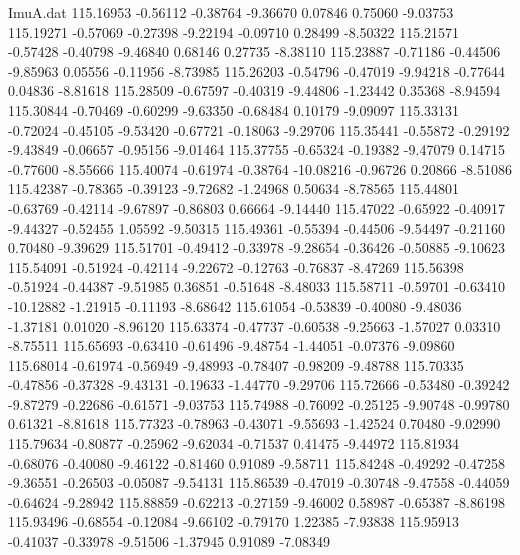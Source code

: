 \begin{filecontents}{ImuA.dat}
 115.16953   -0.56112   -0.38764   -9.36670    0.07846    0.75060   -9.03753
 115.19271   -0.57069   -0.27398   -9.22194   -0.09710    0.28499   -8.50322
 115.21571   -0.57428   -0.40798   -9.46840    0.68146    0.27735   -8.38110
 115.23887   -0.71186   -0.44506   -9.85963    0.05556   -0.11956   -8.73985
 115.26203   -0.54796   -0.47019   -9.94218   -0.77644    0.04836   -8.81618
 115.28509   -0.67597   -0.40319   -9.44806   -1.23442    0.35368   -8.94594
 115.30844   -0.70469   -0.60299   -9.63350   -0.68484    0.10179   -9.09097
 115.33131   -0.72024   -0.45105   -9.53420   -0.67721   -0.18063   -9.29706
 115.35441   -0.55872   -0.29192   -9.43849   -0.06657   -0.95156   -9.01464
 115.37755   -0.65324   -0.19382   -9.47079    0.14715   -0.77600   -8.55666
 115.40074   -0.61974   -0.38764  -10.08216   -0.96726    0.20866   -8.51086
 115.42387   -0.78365   -0.39123   -9.72682   -1.24968    0.50634   -8.78565
 115.44801   -0.63769   -0.42114   -9.67897   -0.86803    0.66664   -9.14440
 115.47022   -0.65922   -0.40917   -9.44327   -0.52455    1.05592   -9.50315
 115.49361   -0.55394   -0.44506   -9.54497   -0.21160    0.70480   -9.39629
 115.51701   -0.49412   -0.33978   -9.28654   -0.36426   -0.50885   -9.10623
 115.54091   -0.51924   -0.42114   -9.22672   -0.12763   -0.76837   -8.47269
 115.56398   -0.51924   -0.44387   -9.51985    0.36851   -0.51648   -8.48033
 115.58711   -0.59701   -0.63410  -10.12882   -1.21915   -0.11193   -8.68642
 115.61054   -0.53839   -0.40080   -9.48036   -1.37181    0.01020   -8.96120
 115.63374   -0.47737   -0.60538   -9.25663   -1.57027    0.03310   -8.75511
 115.65693   -0.63410   -0.61496   -9.48754   -1.44051   -0.07376   -9.09860
 115.68014   -0.61974   -0.56949   -9.48993   -0.78407   -0.98209   -9.48788
 115.70335   -0.47856   -0.37328   -9.43131   -0.19633   -1.44770   -9.29706
 115.72666   -0.53480   -0.39242   -9.87279   -0.22686   -0.61571   -9.03753
 115.74988   -0.76092   -0.25125   -9.90748   -0.99780    0.61321   -8.81618
 115.77323   -0.78963   -0.43071   -9.55693   -1.42524    0.70480   -9.02990
 115.79634   -0.80877   -0.25962   -9.62034   -0.71537    0.41475   -9.44972
 115.81934   -0.68076   -0.40080   -9.46122   -0.81460    0.91089   -9.58711
 115.84248   -0.49292   -0.47258   -9.36551   -0.26503   -0.05087   -9.54131
 115.86539   -0.47019   -0.30748   -9.47558   -0.44059   -0.64624   -9.28942
 115.88859   -0.62213   -0.27159   -9.46002    0.58987   -0.65387   -8.86198
 115.93496   -0.68554   -0.12084   -9.66102   -0.79170    1.22385   -7.93838
 115.95913   -0.41037   -0.33978   -9.51506   -1.37945    0.91089   -7.08349

\end{filecontents}
